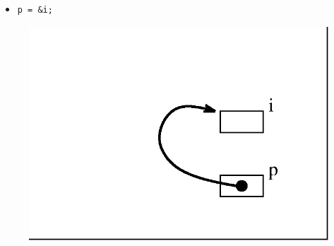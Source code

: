 \begin{frame}[fragile]
\begin{columns}[T]
\pause
\begin{column}{0.45\textwidth}
\begin{itemize}[<+->]
\item 
\begin{verbatim}
p = &i;
\end{verbatim}
\end{itemize}
\begin{center}
\begin{figure}[h]
\centerline{
\includegraphics[scale=0.40]{../Figs/point8_3.eps}
}
\end{figure}
\end{center}
\end{column}

\end{columns}
\end{frame}


